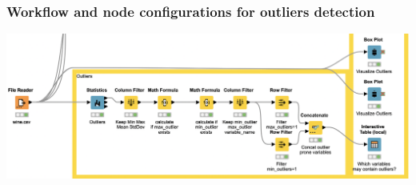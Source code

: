 \documentclass[11pt]{article}
\begin{document}
			\subsubsection*{Workflow and node configurations for outliers detection}
				\iftrue
				\begin{center}
					\includegraphics[scale=0.5]{res/t0/t03/t03-workflow}
				\end{center}
				\fi
				\iftrue
\end{document}
